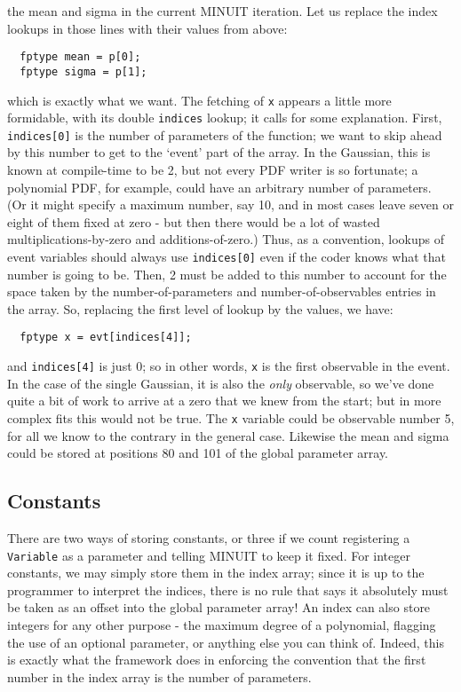 \documentclass[12pt,pdflatex]{article}
\begin{document}
the mean and sigma in the current MINUIT iteration. Let us replace the index
lookups in those lines with their values from above:
\begin{verbatim}
  fptype mean = p[0];
  fptype sigma = p[1]; 
\end{verbatim}
which is exactly what we want. The fetching of \verb|x| appears a little
more formidable, with its double \verb|indices| lookup; it calls for
some explanation. First, \verb|indices[0]| is the number of parameters
of the function; we want to skip ahead by this number to get to the `event'
part of the array. In the Gaussian, this is known at compile-time to be
2, but not every PDF writer is so fortunate; a polynomial PDF, for example,
could have an arbitrary number of parameters. (Or it might specify a maximum
number, say 10, and in most cases leave seven or eight of them fixed at zero - 
but then there would be a lot of wasted multiplications-by-zero and additions-of-zero.) 
Thus, as a convention, lookups of event variables should always use 
\verb|indices[0]| even if the coder knows what that number is going to be.
Then, 2 must be added to this number to account for the space taken
by the number-of-parameters and number-of-observables entries in the array.
So, replacing the first level of lookup by the values, we have:
\begin{verbatim}
  fptype x = evt[indices[4]]; 
\end{verbatim}
and \verb|indices[4]| is just 0; so in other words, \verb|x| is the first
observable in the event. In the case of the single Gaussian, it is
also the \emph{only} observable, so we've done quite a bit of work to
arrive at a zero that we knew from the start; but in more complex fits this would not be true. 
The \verb|x| variable could be observable number 5, for all we know
to the contrary in the general case. Likewise the mean and sigma
could be stored at positions 80 and 101 of the global parameter array. 

\subsection{Constants}

There are two ways of storing constants, or three if we count
registering a \texttt{Variable} as a parameter and telling MINUIT to keep
it fixed. For integer constants, we may simply store them in the
index array; since it is up to the programmer to interpret the
indices, there is no rule that says it absolutely must be taken
as an offset into the global parameter array! An index can also
store integers for any other purpose - the maximum degree of a 
polynomial, flagging the use of an optional parameter, or anything
else you can think of. Indeed, this is exactly
what the framework does in enforcing the convention that the first
number in the index array is the number of parameters. 
\end{document}

